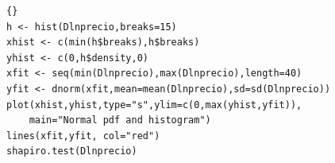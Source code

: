 %
\pagebreak
{}
\begin{lstlisting}[title={‘Código R de histograma y ajuste de curva normal’},basicstyle=\ttfamily]{}
h <- hist(Dlnprecio,breaks=15)
xhist <- c(min(h$breaks),h$breaks)
yhist <- c(0,h$density,0)
xfit <- seq(min(Dlnprecio),max(Dlnprecio),length=40)
yfit <- dnorm(xfit,mean=mean(Dlnprecio),sd=sd(Dlnprecio))
plot(xhist,yhist,type="s",ylim=c(0,max(yhist,yfit)), 
	main="Normal pdf and histogram")
lines(xfit,yfit, col="red")
shapiro.test(Dlnprecio)
\end{lstlisting}

